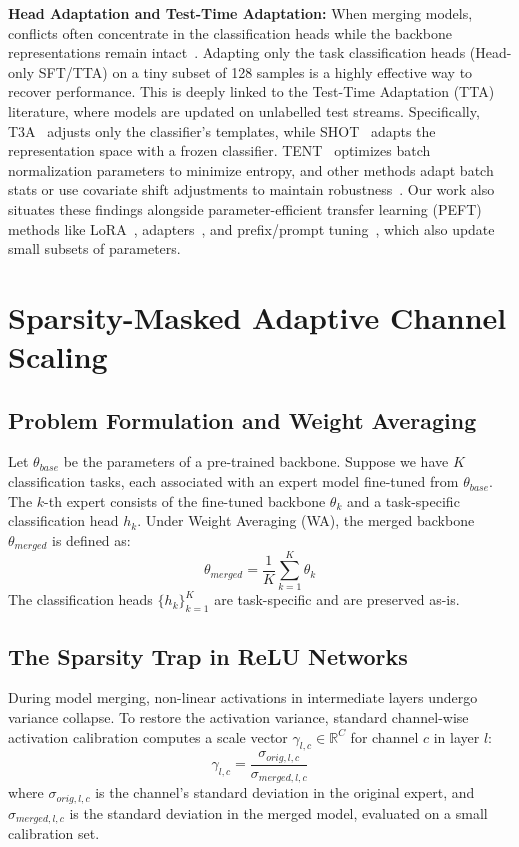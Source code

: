 \documentclass{article}
\theoremstyle{plain}
\theoremstyle{definition}
\theoremstyle{remark}
\begin{document}
\textbf{Head Adaptation and Test-Time Adaptation:} When merging models, conflicts often concentrate in the classification heads while the backbone representations remain intact~\cite{submission10}. Adapting only the task classification heads (Head-only SFT/TTA) on a tiny subset of 128 samples is a highly effective way to recover performance. This is deeply linked to the Test-Time Adaptation (TTA) literature, where models are updated on unlabelled test streams. Specifically, T3A~\cite{iwasawa2021test} adjusts only the classifier's templates, while SHOT~\cite{liang2020do} adapts the representation space with a frozen classifier. TENT~\cite{wang2021tent} optimizes batch normalization parameters to minimize entropy, and other methods adapt batch stats or use covariate shift adjustments to maintain robustness~\cite{nado2020evaluating,schneider2020improving,boudiaf2022parameter,mummadi2021test}. Our work also situates these findings alongside parameter-efficient transfer learning (PEFT) methods like LoRA~\cite{hu2021lora}, adapters~\cite{houlsby2019parameter}, and prefix/prompt tuning~\cite{li2021prefix,lester2021power}, which also update small subsets of parameters.

\section{Sparsity-Masked Adaptive Channel Scaling}
\label{sec:method}

\subsection{Problem Formulation and Weight Averaging}
Let $\theta_{base}$ be the parameters of a pre-trained backbone. Suppose we have $K$ classification tasks, each associated with an expert model fine-tuned from $\theta_{base}$. The $k$-th expert consists of the fine-tuned backbone $\theta_k$ and a task-specific classification head $h_k$. Under Weight Averaging (WA), the merged backbone $\theta_{merged}$ is defined as:
\begin{equation}
    \theta_{merged} = \frac{1}{K} \sum_{k=1}^K \theta_k
\end{equation}
The classification heads $\{h_k\}_{k=1}^K$ are task-specific and are preserved as-is.

\subsection{The Sparsity Trap in ReLU Networks}
During model merging, non-linear activations in intermediate layers undergo variance collapse. To restore the activation variance, standard channel-wise activation calibration computes a scale vector $\gamma_{l, c} \in \mathbb{R}^C$ for channel $c$ in layer $l$:
\begin{equation}
    \gamma_{l, c} = \frac{\sigma_{orig, l, c}}{\sigma_{merged, l, c}}
\end{equation}
where $\sigma_{orig, l, c}$ is the channel's standard deviation in the original expert, and $\sigma_{merged, l, c}$ is the standard deviation in the merged model, evaluated on a small calibration set.
\end{document}
